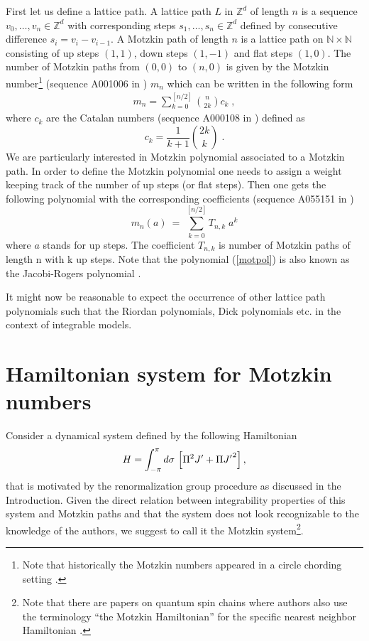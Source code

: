 \documentclass[12pt]{article}%
\numberwithin{equation}{section}
\begin{document}
First let us define a lattice path. A lattice path $L$ in $\mathbb{Z}^d$ of length $n$ is a sequence $v_0, \ldots, v_n \in \mathbb{Z}^d$ with corresponding steps $s_1, \ldots, s_n \in \mathbb{Z}^d$ defined by consecutive difference $s_i=v_i-v_{i-1}$. A Motzkin path of length $n$ is a lattice path on $\mathbb{N} \times \mathbb{N}$ consisting of up steps $(1, 1)$, down steps $(1, -1)$ and flat steps $(1,0)$. The number of Motzkin paths from $(0, 0)$ to $(n, 0)$ is given by the Motzkin number\footnote{Note that historically the Motzkin numbers appeared in a circle chording setting \cite{motzkin}.} (sequence A001006 in \cite{Sloane}) $m_n$ which can be written in the following form 
\begin{eqnarray}
m_n = \sum_{k=0}^{ [n/2]} {n \choose 2k} c_k \;,
\end{eqnarray}
where $c_k$ are the Catalan numbers (sequence A000108 in \cite{Sloane}) defined as
\begin{equation}
c_k = \frac{1}{k+1} {2k \choose k} \;.
\end{equation}
We are particularly interested in Motzkin polynomial associated to a Motzkin path. In order to define the Motzkin polynomial one needs to assign a weight keeping track of the number of up steps (or flat steps). Then one gets the following polynomial  with the corresponding coefficients (sequence A055151 in \cite{Sloane})
\begin{equation} \label{motpol}
m_n(a) \ = \ \sum^{[n/2]}_{k=0} T_{n,k} \; a^{k} 
\end{equation}
where $a$ stands for up steps. The coefficient $T_{n,k}$ is number of Motzkin paths of length n with k up steps. Note that the polynomial (\ref{motpol}) is also known as the Jacobi-Rogers polynomial \cite{flajolet}.

It might now be reasonable to expect the occurrence of other lattice path polynomials such that the Riordan polynomials, Dick polynomials etc. in the context of integrable models.






\section{Hamiltonian system for Motzkin numbers}


Consider a dynamical system defined by the following Hamiltonian
\begin{equation}
\label{H}
H=\int_{-\pi}^{\pi}d\sigma\, \left[\Pi^2J'+\Pi{J'}^2\right],
\end{equation}
that is motivated by the renormalization group procedure as discussed in the Introduction. Given the direct relation between integrability properties of this system and Motzkin paths and that the system does not look recognizable to the knowledge of the authors, we suggest to call it the Motzkin system\footnote{Note that there are papers \cite{doi:10.1063/1.4977829, chen2017quantum} on quantum spin chains where authors also use the terminology ``the Motzkin Hamiltonian'' for the specific nearest neighbor Hamiltonian \cite{bravyi}.}.
\end{document}
